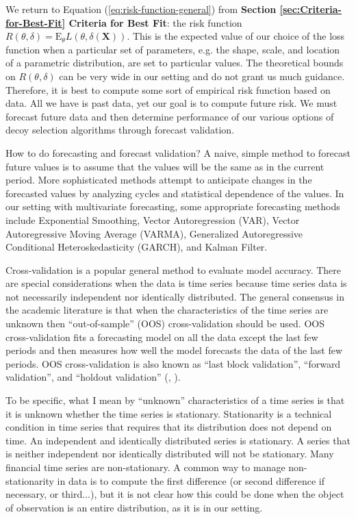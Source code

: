 \documentclass[english]{article}
\begin{document}
We return to Equation (\ref{eq:risk-function-general}) from \textbf{Section
\ref{sec:Criteria-for-Best-Fit} Criteria for Best Fit}: the risk
function $R(\theta,\delta)=\mathrm{E}_{\theta}L(\theta,\delta(\mathbf{X}))$.
This is the expected value of our choice of the loss function when
a particular set of parameters, e.g. the shape, scale, and location
of a parametric distribution, are set to particular values. The theoretical
bounds on $R(\theta,\delta)$ can be very wide in our setting and
do not grant us much guidance. Therefore, it is best to compute some
sort of empirical risk function based on data. All we have is past
data, yet our goal is to compute future risk. We must forecast future
data and then determine performance of our various options of decoy
selection algorithms through forecast validation.

How to do forecasting and forecast validation? A naive, simple method
to forecast future values is to assume that the values will be the
same as in the current period. More sophisticated methods attempt
to anticipate changes in the forecasted values by analyzing cycles
and statistical dependence of the values. In our setting with multivariate
forecasting, some appropriate forecasting methods include Exponential
Smoothing, Vector Autoregression (VAR), Vector Autoregressive Moving
Average (VARMA), Generalized Autoregressive Conditional Heteroskedasticity
(GARCH), and Kalman Filter.

Cross-validation is a popular general method to evaluate model accuracy.
There are special considerations when the data is time series because
time series data is not necessarily independent nor identically distributed.
The general consensus in the academic literature is that when the
characteristics of the time series are unknown then ``out-of-sample''
(OOS) cross-validation should be used. OOS cross-validation fits a
forecasting model on all the data except the last few periods and
then measures how well the model forecasts the data of the last few
periods. OOS cross-validation is also known as ``last block validation'',
``forward validation'', and ``holdout validation'' (\cite{BERGMEIR2012192},
\cite{Cerqueira2020}).

To be specific, what I mean by ``unknown'' characteristics of a
time series is that it is unknown whether the time series is stationary.
Stationarity is a technical condition in time series that requires
that its distribution does not depend on time. An independent and
identically distributed series is stationary. A series that is neither
independent nor identically distributed will not be stationary. Many
financial time series are non-stationary. A common way to manage non-stationarity
in data is to compute the first difference (or second difference if
necessary, or third...), but it is not clear how this could be done
when the object of observation is an entire distribution, as it is
in our setting.
\end{document}
